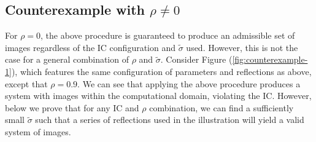 \documentclass[10pt]{article}
\begin{document}


\subsection{Counterexample with $\rho \neq 0$}
For $\rho=0$, the above procedure is guaranteed to produce an
admissible set of images regardless of the IC configuration and
$\tilde{\sigma}$ used. However, this is not the case for a general
combination of $\rho$ and $\tilde{\sigma}$. Consider Figure
(\ref{fig:counterexample-1}), which features the same configuration of
parameters and reflections as above, except that $\rho=0.9$. We can
see that applying the above procedure produces a system with images
within the computational domain, violating the IC.  However, below we
prove that for any IC and $\rho$ combination, we can find a
sufficiently small $\tilde{\sigma}$ such that a series of reflections
used in the illustration will yield a valid system of images.
\end{document}
